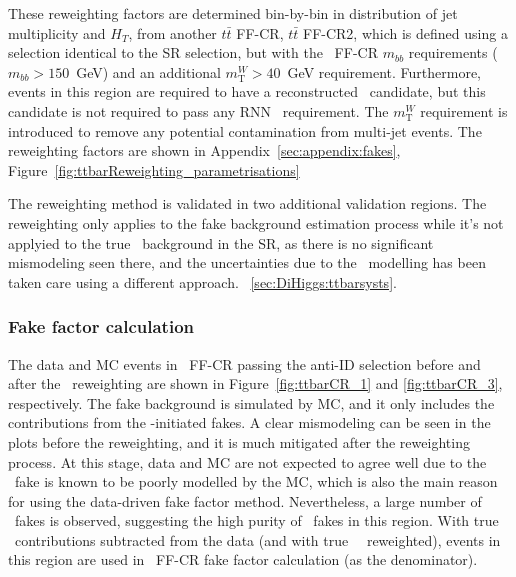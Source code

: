 These reweighting factors are determined bin-by-bin 
in distribution of jet multiplicity and $H_T$,
from another $t\bar{t}$ FF-CR, $t\bar{t}$ FF-CR2,
which is defined using a selection identical to the SR selection,
but with the \ttbar\ FF-CR $m_{bb}$ requirements ($m_{bb}>150$~GeV)
and an additional $m^{W}_\text{T}>40$~GeV requirement. 
Furthermore, events in this region are required
to have a reconstructed \tauhad\ candidate, but this candidate is not required
to pass any RNN \tauhad\ requirement.
The $m^{W}_\text{T}$ requirement is introduced to remove any potential contamination from multi-jet events.
The reweighting factors are shown in Appendix~\ref{sec:appendix:fakes}, 
Figure~\ref{fig:ttbarReweighting_parametrisations}

The reweighting method is validated in two additional validation regions.
The reweighting only applies to the fake background estimation process
while it's not applyied to the true \ttbar\ background in the SR, 
as there is no significant mismodeling seen there, and
the uncertainties due to the \ttbar\ modelling has been taken care using a different approach.
~\ref{sec:DiHiggs:ttbarsysts}.


\subsubsection{Fake factor calculation}
The data and MC events in \ttbar\ FF-CR passing the anti-ID selection 
before and after the \ttbar\ reweighting 
are shown in Figure~\ref{fig:ttbarCR_1} and \ref{fig:ttbarCR_3}, respectively.
The fake background is simulated by MC, and it only includes 
the contributions from the \ttbar-initiated fakes. 
A clear mismodeling can be seen in the plots before 
the reweighting, and it is much mitigated after the 
reweighting process. At this stage, data and MC are 
not expected to agree well due to the \ttbar\ fake is known to
be poorly modelled by the MC, which is also the main reason 
for using the data-driven fake factor method. 
Nevertheless, a large number of \ttbar\ fakes is observed, suggesting
the high purity of \ttbar\ fakes in this region. 
With true \tauhad\ contributions subtracted from the data 
(and with true \tauhad\ \ttbar\ reweighted),  
events in this region are used in \ttbar\ FF-CR fake factor calculation
(as the denominator). 




